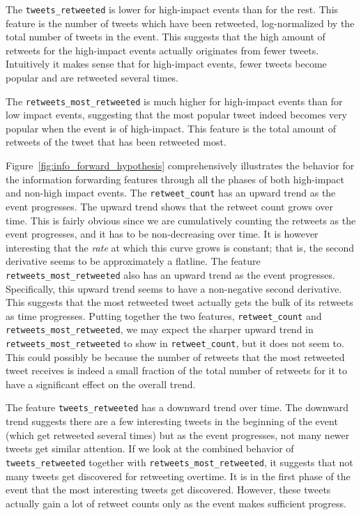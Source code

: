 The \texttt{tweets\_retweeted} is lower for high-impact events than
for the rest. This feature is the number of tweets which have been
retweeted, log-normalized by the total number of tweets in the event.
This suggests that the high amount of retweets for the high-impact
events actually originates from fewer tweets. Intuitively it makes
sense that for high-impact events, fewer tweets become popular and are
retweeted several times.

The \texttt{retweets\_most\_retweeted} is much higher for high-impact
events than for low impact events, suggesting that the most popular
tweet indeed becomes very popular when the event is of high-impact.
This feature is the total amount of retweets of the tweet that has
been retweeted most.

Figure~\ref{fig:info_forward_hypothesis} comprehensively illustrates
the behavior for the information forwarding features through all the
phases of both high-impact and non-high impact events. The
\texttt{retweet\_count} has an upward trend as the event progresses.
The upward trend shows that the retweet count grows over time. This is
fairly obvious since we are cumulatively counting the retweets as the
event progresses, and it has to be non-decreasing over time. It is
however interesting that the \emph{rate} at which this curve grows is
constant; that is, the second derivative seems to be approximately a
flatline. The feature \texttt{retweets\_most\_retweeted} also has an
upward trend as the event progresses. Specifically, this upward trend
seems to have a non-negative second derivative. This suggests that the
most retweeted tweet actually gets the bulk of its retweets as time
progresses. Putting together the two features, \texttt{retweet\_count}
and \texttt{retweets\_most\_retweeted}, we may expect the sharper
upward trend in \texttt{retweets\_most\_retweeted} to show in
\texttt{retweet\_count}, but it does not seem to. This could possibly
be because the number of retweets that the most retweeted tweet
receives is indeed a small fraction of the total number of retweets
for it to have a significant effect on the overall trend.

The feature \texttt{tweets\_retweeted} has a downward trend over time.
The downward trend suggests there are a few interesting tweets in the
beginning of the event (which get retweeted several times) but as the
event progresses, not many newer tweets get similar attention. If we
look at the combined behavior of \texttt{tweets\_retweeted} together
with \texttt{retweets\_most\_retweeted}, it suggests that not many
tweets get discovered for retweeting overtime. It is in the first
phase of the event that the most interesting tweets get discovered.
However, these tweets actually gain a lot of retweet counts only as
the event makes sufficient progress.

